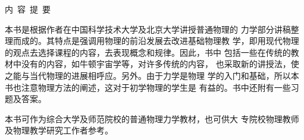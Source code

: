 \begin{center}
        \begin{minipage}{8.4cm}\vspace{3cm}
                \begin{center}\heiti 内~容~提~要\end{center}
                \normalfont {}
                \hspace{2em}本书是根据作者在中国科学技术大学及北京大学讲授普通物理的
                力学部分讲稿整理而成的。其特点是强调用物理的前沿发展去改进基础物理教
                学，即用现代物理的观点去选择课程的内容，去表现概念和规律。因此，书中
                包括一些在传统的教材中没有的内容，如牛顿宇宙学等，对许多传统的内容，
                也采取新的讲授法，使之能与当代物理的进展相呼应。另外。由于力学是物理
                学的入门和基础，所以本书也注意物理方法的阐述，这对于初学物理的学生是
                有益的。书中还附有一些习题及答案。

                \hspace{2em}本书可作为综合大学及师范院校的普通物理力学教材，也可供大
                专院校物理教师及物理教学研究工作者参考。
        \end{minipage}
\end{center}
\thispagestyle{empty}
\clearpage